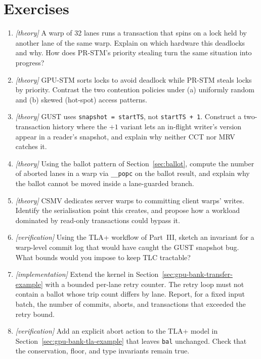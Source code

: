\section{Exercises}
\begin{enumerate}
    \item \emph{[theory]} A warp of 32 lanes runs a transaction that spins on a lock held by
          another lane of the same warp. Explain on which hardware this
          deadlocks and why. How does PR-STM's priority stealing turn the same
          situation into progress?
    \item \emph{[theory]} GPU-STM sorts locks to avoid deadlock while PR-STM steals locks by
          priority. Contrast the two contention policies under (a) uniformly
          random and (b) skewed (hot-spot) access patterns.
    \item \emph{[theory]} GUST uses \texttt{snapshot = startTS}, not \texttt{startTS + 1}.
          Construct a two-transaction history where the $+1$ variant lets an
          in-flight writer's version appear in a reader's snapshot, and
          explain why neither CCT nor MRV catches it.
    \item \emph{[theory]} Using the ballot pattern of Section~\ref{sec:ballot}, compute the
          number of aborted lanes in a warp via \texttt{\_\_popc} on the
          ballot result, and explain why the ballot cannot be moved inside a
          lane-guarded branch.
    \item \emph{[theory]} CSMV dedicates server warps to committing client warps' writes.
          Identify the serialisation point this creates, and propose how a
          workload dominated by read-only transactions could bypass it.
    \item \emph{[verification]} Using the TLA+ workflow of Part~III, sketch an invariant for a
          warp-level commit log that would have caught the GUST snapshot bug.
          What bounds would you impose to keep TLC tractable?
\item \emph{[implementation]} Extend the kernel in Section~\ref{sec:gpu-bank-transfer-example} with a bounded per-lane retry counter. The retry loop must not contain a ballot whose trip count differs by lane. Report, for a fixed input batch, the number of commits, aborts, and transactions that exceeded the retry bound.

\item \emph{[verification]} Add an explicit abort action to the TLA+ model in Section~\ref{sec:gpu-bank-tla-example} that leaves \texttt{bal} unchanged. Check that the conservation, floor, and type invariants remain true.


\end{enumerate}
